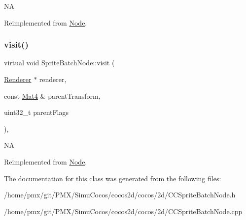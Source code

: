 NA 

Reimplemented from \hyperlink{classNode_a7d794a5e30745611ec33881a625edf26}{Node}.

\mbox{\label{classSpriteBatchNode_a2cccb328ace35dc3e02d7ca8824df65d}} 
\subsubsection{\texorpdfstring{visit()}{visit()}\hspace{0.1cm}{\footnotesize\ttfamily [2/2]}}
{\footnotesize\ttfamily virtual void Sprite\+Batch\+Node\+::visit (\begin{DoxyParamCaption}\item[{\hyperlink{classRenderer}{Renderer} $\ast$}]{renderer,  }\item[{const \hyperlink{classMat4}{Mat4} \&}]{parent\+Transform,  }\item[{uint32\+\_\+t}]{parent\+Flags }\end{DoxyParamCaption})\hspace{0.3cm}{\ttfamily [override]}, {\ttfamily [virtual]}}

NA 

Reimplemented from \hyperlink{classNode_a7d794a5e30745611ec33881a625edf26}{Node}.



The documentation for this class was generated from the following files\+:\begin{DoxyCompactItemize}
\item 
/home/pmx/git/\+P\+M\+X/\+Simu\+Cocos/cocos2d/cocos/2d/C\+C\+Sprite\+Batch\+Node.\+h\item 
/home/pmx/git/\+P\+M\+X/\+Simu\+Cocos/cocos2d/cocos/2d/C\+C\+Sprite\+Batch\+Node.\+cpp\end{DoxyCompactItemize}
